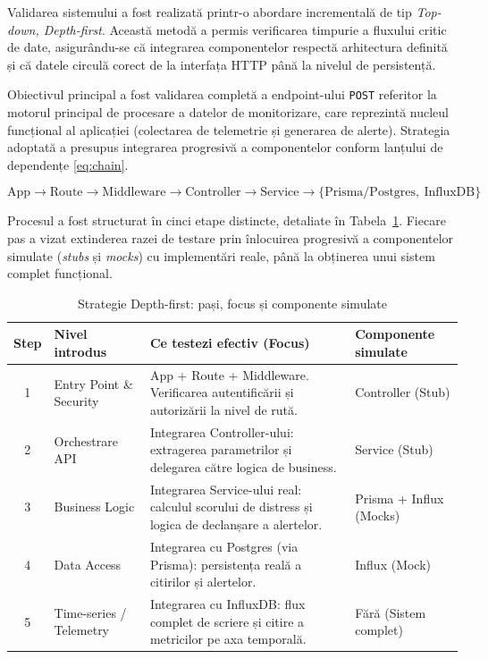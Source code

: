 Validarea sistemului a fost realizată printr-o abordare incrementală de tip \textit{Top-down, Depth-first}. Această metodă a permis verificarea timpurie a fluxului critic de date, asigurându-se că integrarea componentelor respectă arhitectura definită și că datele circulă corect de la interfața HTTP până la nivelul de persistență.

Obiectivul principal a fost validarea completă a endpoint-ului \texttt{POST} referitor la motorul principal de procesare a datelor de monitorizare, care reprezintă nucleul funcțional al aplicației (colectarea de telemetrie și generarea de alerte). Strategia adoptată a presupus integrarea progresivă a componentelor conform lanțului de dependențe \eqref{eq:chain}.

\begin{equation}
\text{App} \rightarrow \text{Route} \rightarrow \text{Middleware} \rightarrow \text{Controller} \rightarrow \text{Service} \rightarrow \{\text{Prisma/Postgres},\ \text{InfluxDB}\}
\label{eq:chain}
\end{equation}

Procesul a fost structurat în cinci etape distincte, detaliate în Tabela~\ref{tab:integration-depth-first-steps}. Fiecare pas a vizat extinderea razei de testare prin înlocuirea progresivă a componentelor simulate (\textit{stubs} și \textit{mocks}) cu implementări reale, până la obținerea unui sistem complet funcțional.

\begin{table}[htbp]
	\centering
	\small
	\renewcommand{\arraystretch}{1.15}
	\caption{Strategie Depth-first: pași, focus și componente simulate}
	\label{tab:integration-depth-first-steps}
	\begin{tabular}{|c|p{3.6cm}|p{7.0cm}|p{3.2cm}|}
		\hline
		\textbf{Step} & \textbf{Nivel introdus} & \textbf{Ce testezi efectiv (Focus)} & \textbf{Componente simulate} \\ \hline
		1 & Entry Point \& Security & App + Route + Middleware. Verificarea autentificării și autorizării la nivel de rută. & Controller (Stub) \\ \hline
		2 & Orchestrare API & Integrarea Controller-ului: extragerea parametrilor și delegarea către logica de business. & Service (Stub) \\ \hline
		3 & Business Logic & Integrarea Service-ului real: calculul scorului de distress și logica de declanșare a alertelor. & Prisma + Influx (Mocks) \\ \hline
		4 & Data Access & Integrarea cu Postgres (via Prisma): persistența reală a citirilor și alertelor. & Influx (Mock) \\ \hline
		5 & Time-series / Telemetry & Integrarea cu InfluxDB: flux complet de scriere și citire a metricilor pe axa temporală. & Fără (Sistem complet) \\ \hline
	\end{tabular}
\end{table}


